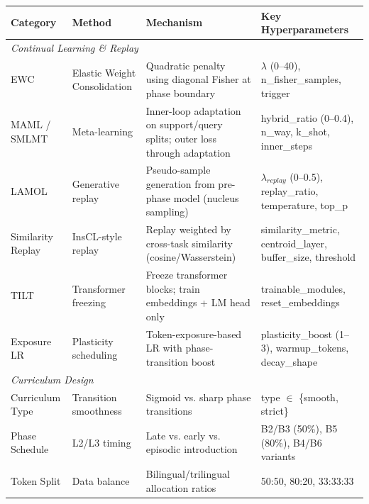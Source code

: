 \begin{table}[t]
\centering
\small
\setlength{\tabcolsep}{3.5pt}
\begin{tabular}{llll}
\toprule
\textbf{Category} & \textbf{Method} & \textbf{Mechanism} & \textbf{Key Hyperparameters} \\
\midrule

\multicolumn{4}{l}{\textit{Continual Learning \& Replay}} \\

EWC & Elastic Weight Consolidation 
& Quadratic penalty using diagonal Fisher at phase boundary 
& $\lambda$ (0--40), n\_fisher\_samples, trigger \\

MAML / SMLMT & Meta-learning 
& Inner-loop adaptation on support/query splits; outer loss through adaptation 
& hybrid\_ratio (0--0.4), n\_way, k\_shot, inner\_steps \\

LAMOL & Generative replay 
& Pseudo-sample generation from pre-phase model (nucleus sampling) 
& $\lambda_{replay}$ (0--0.5), replay\_ratio, temperature, top\_p \\

Similarity Replay & InsCL-style replay 
& Replay weighted by cross-task similarity (cosine/Wasserstein) 
& similarity\_metric, centroid\_layer, buffer\_size, threshold \\

TILT & Transformer freezing 
& Freeze transformer blocks; train embeddings + LM head only 
& trainable\_modules, reset\_embeddings \\

Exposure LR & Plasticity scheduling 
& Token-exposure-based LR with phase-transition boost 
& plasticity\_boost (1--3), warmup\_tokens, decay\_shape \\

\midrule

\multicolumn{4}{l}{\textit{Curriculum Design}} \\

Curriculum Type & Transition smoothness 
& Sigmoid vs. sharp phase transitions 
& type $\in$ \{smooth, strict\} \\

Phase Schedule & L2/L3 timing 
& Late vs. early vs. episodic introduction 
& B2/B3 (50\%), B5 (80\%), B4/B6 variants \\

Token Split & Data balance 
& Bilingual/trilingual allocation ratios 
& 50:50, 80:20, 33:33:33 \\


\end{tabular}
\end{table}
